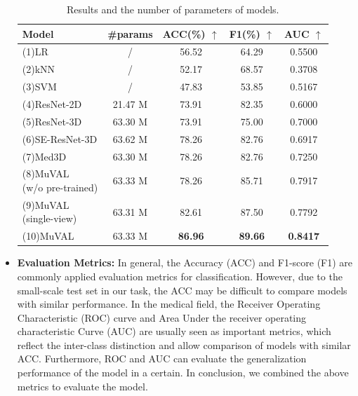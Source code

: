 \begin{itemize}
\begin{table}
 \centering
 \caption{Results and the number of parameters of models.}
 \label{tab:result}
 \tabcolsep=3pt
 \begin{tabular}{lcccc}
  \toprule
Model & \#params & ACC(\%) $\uparrow$ & F1(\%) $\uparrow$ & AUC $\uparrow$\\
  \midrule
    (1)LR & / &  56.52 & 64.29 & 0.5500\\ %
    (2)kNN \cite{cover1967nearest} & / & 52.17 & 68.57 & 0.3708\\ %
    (3)SVM \cite{cortes1995support} &  / &47.83 & 53.85 & 0.5167\\ %
  \midrule
    (4)ResNet-2D \cite{he2016deep} & 21.47 M & 73.91 & 82.35 & 0.6000 \\ %
    (5)ResNet-3D \cite{he2016deep} & 63.30 M & 73.91 & 75.00 & 0.7000\\ %
    (6)SE-ResNet-3D \cite{hu2018squeeze} & 63.62 M & 78.26 & 82.76 & 0.6917\\
  \midrule
    (7)Med3D \cite{chen2019med3d} & 63.30 M & 78.26 & 82.76 & 0.7250\\
    \makecell[l]{(8)MuVAL\\(w/o pre-trained)} & 63.33 M & 78.26 & 85.71 & 0.7917\\
    \makecell[l]{(9)MuVAL\\(single-view)} & 63.31 M & 82.61 & 87.50 & 0.7792\\ %
    (10)MuVAL & 63.33 M & \textbf{86.96} & \textbf{89.66} & \textbf{0.8417}\\ %
  \bottomrule
 \end{tabular}
\end{table}

\item \textbf{Evaluation Metrics:}
    In general, the Accuracy (ACC) and F1-score (F1) are commonly applied evaluation metrics for classification.
    However, due to the small-scale test set in our task, the ACC may be difficult to compare models with similar performance. 
    In the medical field, the Receiver Operating Characteristic (ROC) curve and Area Under the receiver operating characteristic Curve (AUC) are usually seen as important metrics, which reflect the inter-class distinction and allow comparison of models with similar ACC. 
    Furthermore, ROC and AUC can evaluate the generalization performance of the model in a certain. 
    In conclusion, we combined the above metrics to evaluate the model.
\end{itemize}

